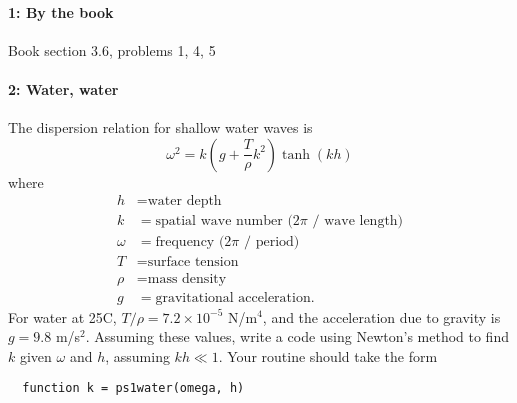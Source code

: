 \documentclass[12pt, leqno]{article}
\begin{document}

\paragraph*{1: By the book}
Book section 3.6, problems 1, 4, 5

\paragraph*{2: Water, water}
The dispersion relation for shallow water waves is
\[
  \omega^2 = k \left(g + \frac{T}{\rho} k^2 \right) \tanh(k h)
\]
where
\begin{align*}
  h &= \mbox{water depth} \\
  k &= \mbox{spatial wave number ($2\pi$ / wave length)} \\
  \omega &= \mbox{frequency ($2\pi$ / period)} \\
  T &= \mbox{surface tension} \\
  \rho &= \mbox{mass density} \\
  g &= \mbox{gravitational acceleration}.
\end{align*}
For water at 25C, $T/\rho = 7.2 \times 10^{-5}$ N/m$^4$, 
and the acceleration due to gravity is $g = 9.8$ m/s$^2$.
Assuming these values, write a code using Newton's method
to find $k$ given $\omega$ and $h$, assuming $kh \ll 1$.
Your routine should take the form
\begin{lstlisting}
  function k = ps1water(omega, h)
\end{lstlisting}
\end{document}
